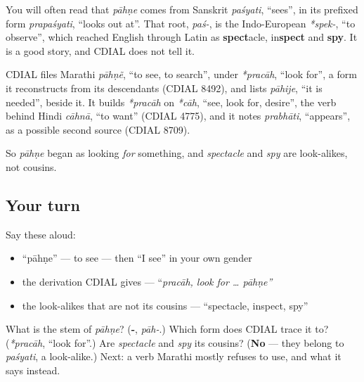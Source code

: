 \begin{cousinweb}
You will often read that \emph{pāhṇe} comes from Sanskrit \textbf{} \emph{paśyati}, \textquotedblleft{}sees\textquotedblright{}, in its prefixed form \emph{prapaśyati}, \textquotedblleft{}looks out at\textquotedblright{}. That root, \emph{paś-}, is the Indo-European \emph{*spek-}, \textquotedblleft{}to observe\textquotedblright{}, which reached English through Latin as \textbf{spect}acle, in\textbf{spect} and \textbf{spy}. It is a good story, and CDIAL does not tell it.

CDIAL files Marathi \emph{pāhṇẽ}, \textquotedblleft{}to see, to search\textquotedblright{}, under \emph{*pracāh}, \textquotedblleft{}look for\textquotedblright{}, a form it reconstructs from its descendants (CDIAL 8492), and lists \emph{pāhije}, \textquotedblleft{}it is needed\textquotedblright{}, beside it. It builds \emph{*pracāh} on \emph{*cāh}, \textquotedblleft{}see, look for, desire\textquotedblright{}, the verb behind Hindi \emph{cāhnā}, \textquotedblleft{}to want\textquotedblright{} (CDIAL 4775), and it notes \emph{prabhāti}, \textquotedblleft{}appears\textquotedblright{}, as a possible second source (CDIAL 8709).

So \emph{pāhṇe} began as looking \emph{for} something, and \emph{spectacle} and \emph{spy} are look-alikes, not cousins.
\end{cousinweb}

\subsection*{Your turn}
Say these aloud:

\begin{itemize}
\raggedright
  \item \textquotedblleft{}pāhṇe\textquotedblright{} — to see — then \textquotedblleft{}I see\textquotedblright{} in your own gender
  \item the derivation CDIAL gives — \textquotedblleft{}\emph{pracāh, look for … pāhṇe\textquotedblright{}}
  \item the look-alikes that are not its cousins — \textquotedblleft{}spectacle, inspect, spy\textquotedblright{}
\end{itemize}

\begin{tcolorbox}[breakable,colback=teal!4,colframe=teal!35!black,title={Before you move on}]
What is the stem of \emph{pāhṇe}? (\textbf{-}, \emph{pāh-}.) Which form does CDIAL trace it to? (\emph{*pracāh}, \textquotedblleft{}look for\textquotedblright{}.) Are \emph{spectacle} and \emph{spy} its cousins? (\textbf{No} — they belong to \emph{paśyati}, a look-alike.) Next: a verb Marathi mostly refuses to use, and what it says instead.
\end{tcolorbox}
